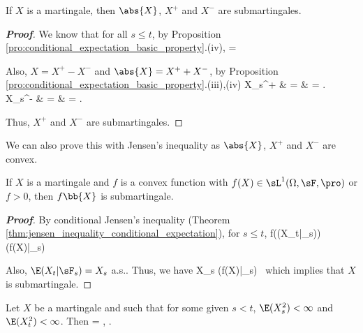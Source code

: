 \begin{proposition}\label{pro:martingale_abs_plus_minus_submartingale}
If $X$ is a martingale, then $\abs{X}$, $X^+$ and $X^-$ are submartingales.
\end{proposition}

\begin{proof}[\bf Proof]
We know that for all $s\leq t$, by Proposition \ref{pro:conditional_expectation_basic_property}.(iv),
\be
{} =  \leq \E{} \ \ra \  
\ee

Also, $X = X^+ - X^-$ and $\abs{X} = X^+ + X^-$, by Proposition \ref{pro:conditional_expectation_basic_property}.(iii),(iv)
\beast
X_s^+ & = &   \leq {}  = \E {} .\\
X_s^- & = &   \leq {}  = \E {} .
\eeast

Thus, $X^+$ and $X^-$ are submartingales.
\end{proof}

\begin{remark}
We can also prove this with Jensen's inequality as $\abs{X}$, $X^+$ and $X^-$ are convex.
\end{remark}

\begin{proposition}\label{pro:convex_implies_submartingale}
If $X$ is a martingale and $f$ is a convex function with $f(X) \in \sL^1(\Omega,\sF,\pro)$ or $f > 0$, then $f\bb{X}$ is submartingale.
\end{proposition}

\begin{proof}[\bf Proof]
By conditional Jensen's inequality (Theorem \ref{thm:jensen_inequality_conditional_expectation}), for $s\leq t$,
\be
f(\E(X_t|\sF_s)) \leq \E(f(X)|\sF_s)\ 
\ee

Also, $\E(X_t|\sF_s) = X_s$ a.s.. Thus, we have
\be
X_s \leq \E(f(X)|\sF_s)\ 
\ee
which implies that $X$ is submartingale.
\end{proof}


\begin{lemma}\label{lem:sl2_martingale_trick}
Let $X$ be a martingale and such that for some given $s < t$, $\E(X^2_s ) < \infty$ and $\E(X^2_t ) < \infty$. Then
\be
\E{} = \E{}, \quad{}.
\ee
\end{lemma}

